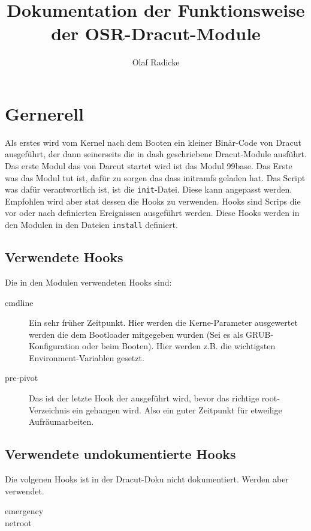 \documentclass[10pt,a4paper]{article}
\author{Olaf Radicke}
\title{Dokumentation der Funktionsweise der OSR-Dracut-Module}
\begin{document}
\maketitle

\newpage 

\tableofcontents

\newpage 

\section{Gernerell}

Als erstes wird vom Kernel nach dem Booten ein kleiner Binär-Code von Dracut ausgeführt, der dann seinerseits die in dash geschriebene Dracut-Module ausführt. Das erste Modul das von Darcut startet wird ist das Modul 99base. Das Erste was das Modul tut ist, dafür zu sorgen das dass initramfs geladen hat. Das Script was dafür verantwortlich ist, ist die \texttt{init}-Datei. Diese kann angepasst werden. Empfohlen wird aber stat dessen die Hooks zu verwenden. Hooks sind Scrips die vor oder nach definierten Ereignissen ausgeführt werden. Diese Hooks werden in den Modulen in den Dateien \texttt{install} definiert.

\subsection{Verwendete Hooks}

Die in den Modulen verwendeten Hooks sind:
\begin{description}
 \item[cmdline] Ein sehr früher Zeitpunkt. Hier werden die Kerne-Parameter ausgewertet werden die dem Bootloader mitgegeben wurden (Sei es als GRUB-Konfiguration oder beim Booten). Hier werden z.B. die wichtigsten Environment-Variablen gesetzt. 
 \item[pre-pivot] Das ist der letzte Hook der ausgeführt wird, bevor  das richtige root-Verzeichnis ein gehangen wird. Also ein guter Zeitpunkt für etweilige Aufräumarbeiten.
\end{description}
 
\subsection{Verwendete undokumentierte Hooks}

Die volgenen Hooks ist in der Dracut-Doku nicht dokumentiert. Werden aber verwendet.

\begin{description}
 \item[emergency] 
 \item[netroot]
\end{description}
\end{document}
